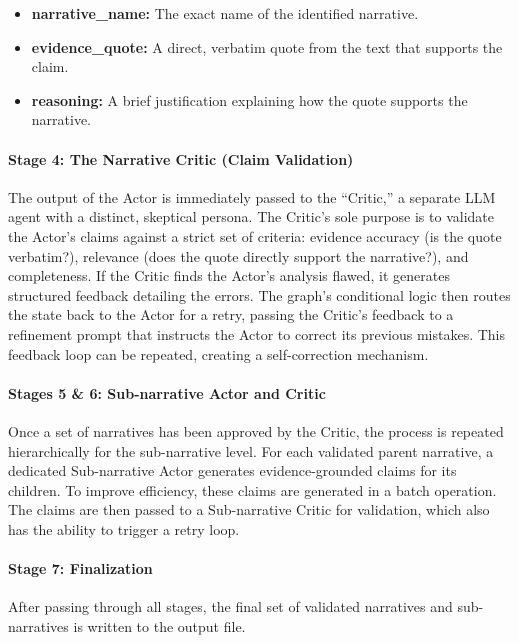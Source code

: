\begin{itemize}
  \item \textbf{narrative\_name:} The exact name of the identified narrative.
  \item \textbf{evidence\_quote:} A direct, verbatim quote from the text that supports the claim.
  \item \textbf{reasoning:} A brief justification explaining how the quote supports the narrative.
\end{itemize}

\paragraph{Stage 4: The Narrative Critic (Claim Validation)}
The output of the Actor is immediately passed to the ``Critic,'' a separate LLM agent with a distinct, skeptical persona. The Critic's sole purpose is to validate the Actor's claims against a strict set of criteria: evidence accuracy (is the quote verbatim?), relevance (does the quote directly support the narrative?), and completeness. If the Critic finds the Actor's analysis flawed, it generates structured feedback detailing the errors. The graph's conditional logic then routes the state back to the Actor for a retry, passing the Critic's feedback to a refinement prompt that instructs the Actor to correct its previous mistakes. This feedback loop can be repeated, creating a self-correction mechanism.

\paragraph{Stages 5 \& 6: Sub-narrative Actor and Critic}
Once a set of narratives has been approved by the Critic, the process is repeated hierarchically for the sub-narrative level. For each validated parent narrative, a dedicated Sub-narrative Actor generates evidence-grounded claims for its children. To improve efficiency, these claims are generated in a batch operation. The claims are then passed to a Sub-narrative Critic for validation, which also has the ability to trigger a retry loop.

\paragraph{Stage 7: Finalization}
After passing through all stages, the final set of validated narratives and sub-narratives is written to the output file.

